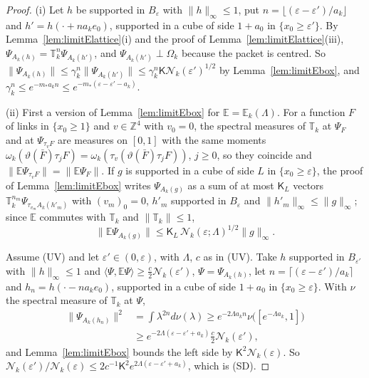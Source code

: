 \documentclass[aps,prd,twocolumn,superscriptaddress,nofootinbib,longbibliography,floatfix,amsmath,amssymb,10pt]{revtex4-2}
\theoremstyle{definition}
\theoremstyle{remark}
\newcommand{\Z}{\mathbb{Z}}
\newcommand{\ip}[2]{\langle #1,#2\rangle}
\begin{document}
\begin{proof}
(i) Let $h$ be supported in $B_\varepsilon$ with $\|h\|_\infty\le1$, put
$n=\lfloor(\varepsilon-\varepsilon')/a_k\rfloor$ and $h'=h(\cdot+na_ke_0)$,
supported in a cube of side $1+a_0$ in $\{x_0\ge\varepsilon'\}$. By
Lemma~\ref{lem:limitElattice}(i) and the proof of
Lemma~\ref{lem:limitElattice}(iii), $\Psi_{A_k(h)}=\mathbb T_k^n
\Psi_{A_k(h')}$, and $\Psi_{A_k(h')}\perp\Omega_k$ because the packet is
centred. So $\|\Psi_{A_k(h)}\|\le\gamma_k^n\|\Psi_{A_k(h')}\|\le\gamma_k^n
\mathsf K\mathcal N_k(\varepsilon')^{1/2}$ by Lemma~\ref{lem:limitEbox}, and
$\gamma_k^n\le e^{-m_*a_kn}\le e^{-m_*(\varepsilon-\varepsilon'-a_k)}$.

(ii) First a version of Lemma~\ref{lem:limitEbox} for $\mathbb E=\mathbb
E_k(\Lambda)$. For a function $F$ of links in $\{x_0\ge1\}$ and $v\in\Z^4$
with $v_0=0$, the spectral measures of $\mathbb T_k$ at $\Psi_F$ and at
$\Psi_{\tau_vF}$ are measures on $[0,1]$ with the same moments
$\omega_k(\vartheta(\bar F)\tau_jF)=\omega_k(\tau_v(\vartheta(\bar F)
\tau_jF))$, $j\ge0$, so they coincide and $\|\mathbb E\Psi_{\tau_vF}\|=
\|\mathbb E\Psi_F\|$. If $g$ is supported in a cube of side $L$ in
$\{x_0\ge\varepsilon\}$, the proof of Lemma~\ref{lem:limitEbox} writes
$\Psi_{A_k(g)}$ as a sum of at most $\mathsf K_L$ vectors $\mathbb
T_k^{n_m}\Psi_{\tau_{v_m}A_k(h'_m)}$ with $(v_m)_0=0$, $h'_m$ supported in
$B_\varepsilon$ and $\|h'_m\|_\infty\le\|g\|_\infty$; since $\mathbb E$
commutes with $\mathbb T_k$ and $\|\mathbb T_k\|\le1$,
\[
\|\mathbb E\Psi_{A_k(g)}\|\le\mathsf K_L\,\mathcal N_k(\varepsilon;
\Lambda)^{1/2}\|g\|_\infty .
\]

Assume (UV) and let $\varepsilon'\in(0,\varepsilon)$, with $\Lambda$, $c$ as
in (UV). Take $h$ supported in $B_{\varepsilon'}$ with $\|h\|_\infty\le1$
and $\ip{\Psi}{\mathbb E\Psi}\ge\frac c2\mathcal N_k(\varepsilon')$,
$\Psi=\Psi_{A_k(h)}$, let $n=\lceil(\varepsilon-\varepsilon')/a_k\rceil$ and
$h_n=h(\cdot-na_ke_0)$, supported in a cube of side $1+a_0$ in
$\{x_0\ge\varepsilon\}$. With $\nu$ the spectral measure of $\mathbb T_k$ at
$\Psi$,
\[
\begin{split}
\|\Psi_{A_k(h_n)}\|^2&=\int\lambda^{2n}d\nu(\lambda)\ge e^{-2\Lambda a_kn}
\nu\bigl([e^{-\Lambda a_k},1]\bigr)\\
&\ge e^{-2\Lambda(\varepsilon-\varepsilon'+a_k)}\tfrac c2\mathcal
N_k(\varepsilon'),
\end{split}
\]
and Lemma~\ref{lem:limitEbox} bounds the left side by $\mathsf K^2\mathcal
N_k(\varepsilon)$. So $\mathcal N_k(\varepsilon')/\mathcal N_k(\varepsilon)
\le2c^{-1}\mathsf K^2e^{2\Lambda(\varepsilon-\varepsilon'+a_k)}$, which is
(SD).


\end{proof}
\end{document}
